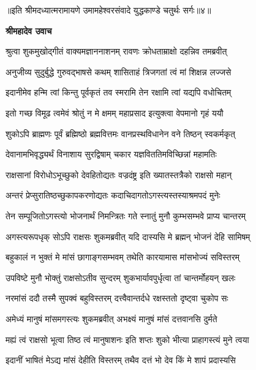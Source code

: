 {॥इति श्रीमदध्यात्मरामायणे उमामहेश्वरसंवादे युद्धकाण्डे
चतुर्थः सर्गः॥४॥
}




\textbf{श्रीमहादेव उवाच}

\twolineshloka
{श्रुत्वा शुकमुखोद्गीतं वाक्यमज्ञाननाशनम्}
{रावणः क्रोधताम्राक्षो दहन्निव तमब्रवीत्} %

\twolineshloka
{अनुजीव्य सुदुर्बुद्धे गुरुवद्भाषसे कथम्}
{शासिताहं त्रिजगतां त्वं मां शिक्षन्न लज्जसे} %

\twolineshloka
{इदानीमेव हन्मि त्वां किन्तु पूर्वकृतं तव}
{स्मरामि तेन रक्षामि त्वां यद्यपि वधोचितम्} %

\twolineshloka
{इतो गच्छ विमूढ त्वमेवं श्रोतुं न मे क्षमम्}
{महाप्रसाद इत्युक्त्वा वेपमानो गृहं ययौ} %

\twolineshloka
{शुकोऽपि ब्राह्मणः पूर्वं ब्रह्मिष्ठो ब्रह्मवित्तमः}
{वानप्रस्थविधानेन वने तिष्ठन् स्वकर्मकृत्} %

\twolineshloka
{देवानामभिवृद्ध्यर्थं विनाशाय सुरद्विषाम्}
{चकार यज्ञविततिमविच्छिन्नां महामतिः} %

\twolineshloka
{राक्षसानां विरोधोऽभूच्छुको देवहितोद्यतः}
{वज्रदंष्ट्र इति ख्यातस्तत्रैको राक्षसो महान्} %

\twolineshloka
{अन्तरं प्रेप्सुरातिष्ठच्छुकापकरणोद्यतः}
{कदाचिदागतोऽगस्त्यस्तस्याश्रमपदं मुनेः} %

\twolineshloka
{तेन सम्पूजितोऽगस्त्यो भोजनार्थं निमन्त्रितः}
{गते स्नातुं मुनौ कुम्भसम्भवे प्राप्य चान्तरम्} %

\twolineshloka
{अगस्त्यरूपधृक् सोऽपि राक्षसः शुकमब्रवीत्}
{यदि दास्यसि मे ब्रह्मन् भोजनं देहि सामिषम्} %

\twolineshloka
{बहुकालं न भुक्तं मे मांसं छागाङ्गसम्भवम्}
{तथेति कारयामास मांसभोज्यं सविस्तरम्} %

\twolineshloka
{उपविष्टे मुनौ भोक्तुं राक्षसोऽतीव सुन्दरम्}
{शुकभार्यावपुर्धृत्वा तां चान्तर्मोहयन् खलः} %

\twolineshloka
{नरमांसं ददौ तस्मै सुपक्वं बहुविस्तरम्}
{दत्त्वैवान्तर्दधे रक्षस्ततो दृष्ट्वा चुकोप सः} %

\twolineshloka
{अमेध्यं मानुषं मांसमगस्त्यः शुकमब्रवीत्}
{अभक्ष्यं मानुषं मांसं दत्तवानसि दुर्मते} %

\twolineshloka
{मह्यं त्वं राक्षसो भूत्वा तिष्ठ त्वं मानुषाशनः}
{इति शप्तः शुको भीत्या प्राहागस्त्यं मुने त्वया} %

\twolineshloka
{इदानीं भाषितं मेऽद्य मांसं देहीति विस्तरम्}
{तथैव दत्तं भो देव किं मे शापं प्रदास्यसि} %

